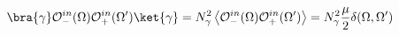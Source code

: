 \begin{equation}
\bra{\gamma}\mathcal{O}^{in}_-(\Omega)
\mathcal{O}^{in}_+(\Omega')\ket{\gamma}=
N^2_{\gamma}\left<\mathcal{O}^{in}_-(\Omega)
\mathcal{O}^{in}_+(\Omega')\right>=
N^2_{\gamma}\frac{\mu}{2}\delta(
\Omega,\Omega')
\end{equation}

